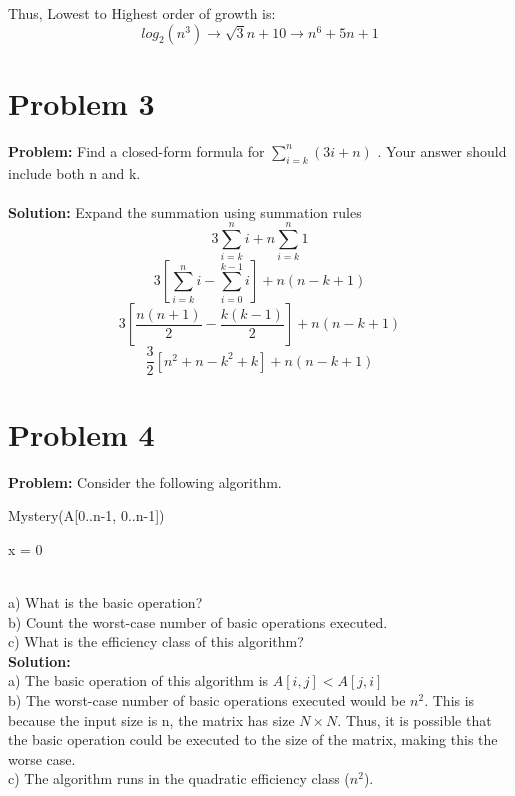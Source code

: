 \documentclass{article}
\begin{document}
Thus, Lowest to Highest order of growth is: \[log_2(n^3) \to \sqrt{3}{n} + 10 \to n^6 +5n +1\]

\section{Problem 3}
\textbf{Problem: }
Find a closed-form formula for $\sum_{i=k}^{n} (3i+n)$ . Your answer should include both n and k. \\
\\
\textbf{Solution: }
Expand the summation using summation rules
\[3 \sum_{i=k}^{n} i + n \sum_{i=k}^{n} 1 \]
\[3[\sum_{i=k}^{n}i - \sum_{i=0}^{k-1}i ] + n(n-k+1) \]
\[3[\frac{n(n+1)}{2} - \frac{k(k-1)}{2}] + n(n-k+1)\]
\[
\boxed
{\frac{3}{2}[n^2 + n - k^2 + k] + n(n-k+1)}
\]

 \pagebreak 
\section{Problem 4}
\textbf{Problem: }
Consider the following algorithm.\\
\begin{algorithm}
\caption{Mystery(A[0..n-1, 0..n-1])}
x = 0 \\
\end{algorithm} \\
a) What is the basic operation? \\
b) Count the worst-case number of basic operations executed.\\
c) What is the efficiency class of this algorithm?\\
\textbf{Solution: }\\
a) The basic operation of this algorithm is $A[i,j] < A[j,i]$\\
b) The worst-case number of basic operations executed would be \approx $ n^2$. This is because the input size is n, the matrix has size $N\times N$. Thus, it is possible that the basic operation could be executed to the size of the matrix, making this the worse case. \\
c) The algorithm runs in the quadratic efficiency class ($n^2$).\\
\end{document}
